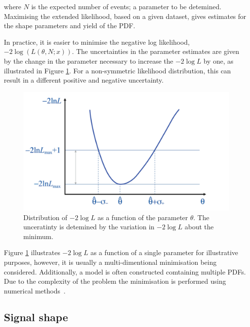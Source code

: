 where $N$ is the expected number of events; a parameter to be detemined. Maximising the extended likelihood, based on a given dataset, gives estimates for the shape parameters and yield of the PDF.

In practice, it is easier to minimise the negative log likelihood, $-2\log(L(\theta, N;x))$. The uncertainties in the parameter estimates are given by the change in the parameter necessary to increase the $-2\log L$ by one, as illustrated in Figure \ref{fig:likelihood}. For a non-symmetric likelihood distribution, this can result in a different positive and negative uncertainty. 

\begin{figure}
\centering
\includegraphics[width=0.7\linewidth]{figures/fitComponents/likelihood.pdf}
\caption{Distribution of $-2\log L$ as a function of the parameter $\theta$. The unceratinty is detemined by the variation in $-2\log L$ about the minimum.}
\label{fig:likelihood}
\end{figure}

Figure \ref{fig:likelihood} illustrates $-2\log L$ as a function of a single parameter for illustrative purposes, however, it is usually a multi-dimentional minimisation being considered. Additionally, a model is often constructed comtaining multiple PDFs. Due to the complexity of the problem the minimisation is performed using numerical methods~\cite{minuit}.


\subsection{Signal shape}
\label{sec:massfit:signal}

